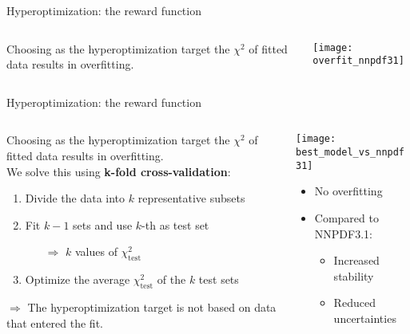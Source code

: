 \begin{frame}[t]{Hyperoptimization: the reward function}
    \begin{columns}[T]
        \begin{column}{0.48\textwidth}
            \vspace{\topsep}
            Choosing as the hyperoptimization target the $\chi^2$ of fitted data results in overfitting.
        \end{column}
        \begin{column}{0.48\textwidth}
            \texttt{[image: overfit\_nnpdf31]}
        \end{column}
    \end{columns}
\end{frame}



\begin{frame}[t]{Hyperoptimization: the reward function}
    \begin{columns}[T]
        \begin{column}{0.48\textwidth}
            \vspace{\topsep}
            Choosing as the hyperoptimization target the $\chi^2$ of fitted data results in overfitting.\\
			\vspace*{2em}			
			We solve this using \textbf{k-fold cross-validation}:
			\begin{enumerate}
			    \item Divide the data into $k$ {representative subsets}
			    \item Fit $k-1$ sets and use $k$-th as test set
			    \begin{itemize}
			        \item[$\Rightarrow$] $k$ values of $\chi^2_\mathrm{test}$
			    \end{itemize}
			    \item Optimize the average $\chi^2_\mathrm{test}$ of the $k$ test sets
			\end{enumerate}
			\vspace*{0.5em}
			$\Rightarrow$ The hyperoptimization target is not based on data that entered the fit. 
        \end{column}
        \begin{column}{0.48\textwidth}
            \texttt{[image: best\_model\_vs\_nnpdf31]}
            \begin{itemize}
                \item No overfitting\\
			    \vspace*{0.2em}
			    \item Compared to NNPDF3.1:
			    \begin{itemize}
			        \item Increased stability
			        \item Reduced uncertainties 
			    \end{itemize}
			\end{itemize}
        \end{column}
    \end{columns}
\end{frame}



